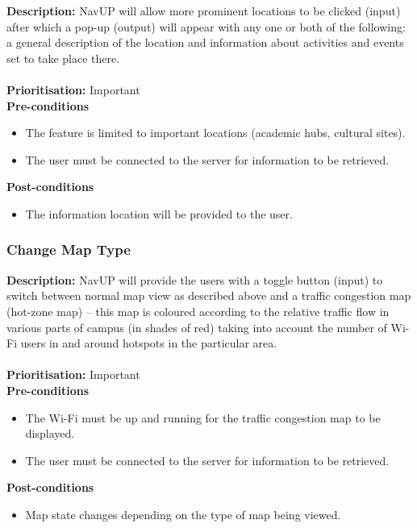 \documentclass[runningheads,a4paper]{article}
\begin{document}
\textbf{Description:}  NavUP will allow more prominent locations to be clicked (input) after which a pop-up (output) will appear with any one or both of the following: a general description of the location and information about activities and events set to take place there.\\\\
\noindent
\textbf{Prioritisation:} Important\\
  
  
\textbf{Pre-conditions}
\begin{itemize}
 	\item The feature is limited to important locations (academic hubs, cultural sites).
	\item The user must be connected to the server for information to be retrieved.
\end{itemize}
  
\textbf{Post-conditions}
\begin{itemize}
  	\item The information location will be provided to the user.
\end{itemize}

\subsubsection{Change Map Type}

\textbf{Description:}  NavUP will provide the users with a toggle button (input) to switch between normal map view as described above and a traffic congestion map (hot-zone map) – this map is coloured according to the relative traffic flow in various parts of campus (in shades of red) taking into account the number of Wi-Fi users in and around hotspots in the particular area.\\\\
\noindent
\textbf{Prioritisation:} Important\\
  
  
\textbf{Pre-conditions}
\begin{itemize}
 	\item The Wi-Fi must be up and running for the traffic congestion map to be displayed.
	\item The user must be connected to the server for information to be retrieved.
\end{itemize}
  
\textbf{Post-conditions}
\begin{itemize}
  	\item Map state changes depending on the type of map being viewed.
\end{itemize}
\end{document}
